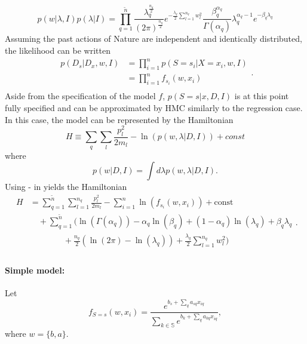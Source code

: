 \begin{example}
	\begin{equation}
		p(w|\lambda,I)p(\lambda|I)
		= \prod_{q=1}^{\tilde{n}} \frac{\lambda_q^\frac{n_q}{2}}{(2\pi)^\frac{n_q}{2}}e^{-\frac{\lambda_q}{2}\sum_{l=1}^{n_q}w_l^2}\frac{\beta_q^{\alpha_q}}{\Gamma(\alpha_q)}\lambda_q^{\alpha_q-1}e^{-\beta_q \lambda_q}
		\label{eq:prior}
	\end{equation}
	Assuming the past actions of Nature are independent and identically distributed, the likelihood can be written 
	\begin{equation}
		\begin{split}
			p(D_s|D_x,w,I) &=\prod_{i=1}^{n}p(S = s_i|X = x_i,w,I)\\
			&=\prod_{i=1}^{n}f_{s_i}(w,x_i)\\
		\end{split}.
		\label{lik}
	\end{equation}
	Aside from the specification of the model $f$, $p(S= s|x,D,I)$ is at this point fully specified and can be approximated by HMC similarly to the regression case. In this case, the model can be represented by the Hamiltonian 
	\begin{equation}
		H \equiv  \sum_{q}\sum_{l}\frac{p_{l}^2}{2m_{l}}-\ln(p(w,\lambda|D,I))+const
		\label{ham3}
	\end{equation}
	where
	\begin{equation}
		p(w|D,I) = \int d\lambda p(w,\lambda|D,I).
	\end{equation}
	Using - in  yields the Hamiltonian
	\begin{equation}
		\begin{split}
			H&=\sum_{q=1}^{\tilde{n}}\sum_{l=1}^{n_q}\frac{p_{l}^2}{2m_{l}}-\sum_{i=1}^{n}\ln(f_{s_i}(w,x_i))+\text{const}\\
			&\quad+\sum_{q=1}^{\tilde{n}}\bigg(\ln(\Gamma(\alpha_q))-\alpha_q\ln(\beta_q)+(1-\alpha_q)\ln(\lambda_q)+\beta_q\lambda_q\\
			&\qquad \qquad+\frac{n_q}{2}(\ln(2\pi)-\ln(\lambda_q))+\frac{\lambda_q}{2}\sum_{l=1}^{n_q}w_l^2\bigg)\\
		\end{split}.
		\label{ham2}
	\end{equation}
	
	\paragraph{Simple model:} Let
	\begin{equation}
		f_{S = s}(w,x_i) = \frac{e^{b_s+\sum_{q}a_{sq}x_{iq}}}{\sum_{k\in \mathbb{S}}e^{b_k+\sum_{q}a_{kq}x_{iq}}},
		\label{eq:f1}
	\end{equation}
	where $w = \{b,a\}$.
	

\end{example}
